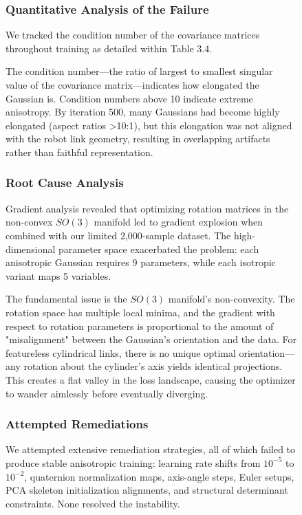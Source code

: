 \documentclass[12pt,a4paper,oneside]{report}
\begin{document}
\begin{figure}[H]
\subsubsection{Quantitative Analysis of the Failure}

We tracked the condition number of the covariance matrices throughout training as detailed within Table 3.4.

The condition number---the ratio of largest to smallest singular value of the covariance matrix---indicates how elongated the Gaussian is. Condition numbers above 10 indicate extreme anisotropy. By iteration 500, many Gaussians had become highly elongated (aspect ratios >10:1), but this elongation was not aligned with the robot link geometry, resulting in overlapping artifacts rather than faithful representation.

\subsubsection{Root Cause Analysis}

Gradient analysis revealed that optimizing rotation matrices in the non-convex $SO(3)$ manifold led to gradient explosion when combined with our limited 2,000-sample dataset. The high-dimensional parameter space exacerbated the problem: each anisotropic Gaussian requires 9 parameters, while each isotropic variant maps 5 variables.

The fundamental issue is the $SO(3)$ manifold's non-convexity. The rotation space has multiple local minima, and the gradient with respect to rotation parameters is proportional to the amount of "misalignment" between the Gaussian's orientation and the data. For featureless cylindrical links, there is no unique optimal orientation---any rotation about the cylinder's axis yields identical projections. This creates a flat valley in the loss landscape, causing the optimizer to wander aimlessly before eventually diverging.

\subsubsection{Attempted Remediations}

We attempted extensive remediation strategies, all of which failed to produce stable anisotropic training: learning rate shifts from $10^{-5}$ to $10^{-2}$, quaternion normalization maps, axis-angle steps, Euler setups, PCA skeleton initialization alignments, and structural determinant constraints. None resolved the instability.


\end{figure}
\end{document}

